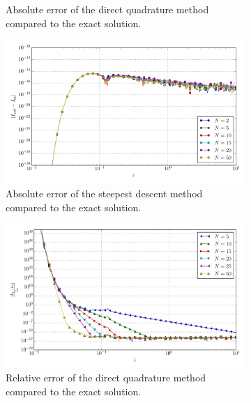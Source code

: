 \documentclass[a4paper,10pt]{article}
\begin{document}
\begin{figure}[ht!]
\begin{subfigure}[t]{0.5\linewidth}
    \caption{Absolute error of the direct quadrature method compared to the exact solution.}
    \label{fig:tp_1d_conv_eps_2_1_err_qr}
  \end{subfigure}
  \begin{subfigure}[t]{0.5\linewidth}
    \includegraphics[width=\linewidth]{./plots/tp_1d_conv_eps_2_1_err_nsd.pdf}
    \caption{Absolute error of the steepest descent method compared to the exact solution.}
    \label{fig:tp_1d_conv_eps_2_1_err_nsd}
  \end{subfigure}
  \begin{subfigure}[t]{0.5\linewidth}
    \includegraphics[width=\linewidth]{./plots/tp_1d_conv_eps_2_1_err_rel_qr.pdf}
    \caption{Relative error of the direct quadrature method compared to the exact solution.}
    \label{fig:tp_1d_conv_eps_2_1_err_qr}
  \end{subfigure}
  \begin{subfigure}[t]{0.5\linewidth}

\end{subfigure}
\end{figure}
\end{document}
